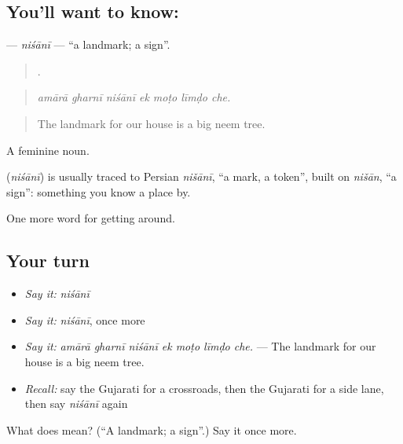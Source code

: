 \subsection*{You'll want to know: }
\textbf{} — \emph{niśānī} — \textquotedblleft{}a landmark; a sign\textquotedblright{}.

\begin{quote}
      .
\end{quote}

\begin{quote}
\emph{amārā gharnī niśānī ek moṭo līmḍo che.}
\end{quote}

\begin{quote}
The landmark for our house is a big neem tree.
\end{quote}

A feminine noun.

\begin{cousinweb}
\textbf{} (\emph{niśānī}) is usually traced to Persian \emph{nišānī}, \textquotedblleft{}a mark, a token\textquotedblright{}, built on \emph{nišān}, \textquotedblleft{}a sign\textquotedblright{}: something you know a place by.
\end{cousinweb}

\begin{grammarlens}[title={What you've built}]
One more word for getting around.
\end{grammarlens}

\subsection*{Your turn}
\begin{itemize}
\raggedright
  \item \emph{Say it:} \emph{niśānī}
  \item \emph{Say it:} \emph{niśānī}, once more
  \item \emph{Say it:} \emph{amārā gharnī niśānī ek moṭo līmḍo che.} — The landmark for our house is a big neem tree.
  \item \emph{Recall:} say the Gujarati for a crossroads, then the Gujarati for a side lane, then say \emph{niśānī} again
\end{itemize}

\begin{tcolorbox}[breakable,colback=teal!4,colframe=teal!35!black,title={Before you move on}]
What does  mean? (\textquotedblleft{}A landmark; a sign\textquotedblright{}.) Say it once more.
\end{tcolorbox}
